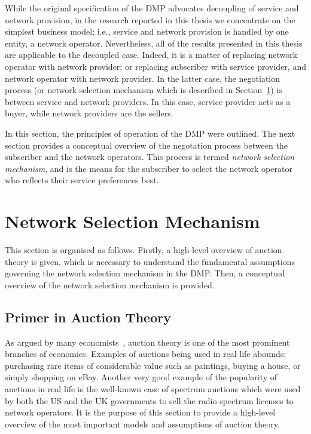 While the original specification of the DMP advocates decoupling of service and network provision, in the research reported in this thesis we concentrate on the simplest business model; i.e., service and network provision is handled by one entity, a network operator. Nevertheless, all of the results presented in this thesis are applicable to the decoupled case. Indeed, it is a matter of replacing network operator with network provider; or replacing subscriber with service provider, and network operator with network provider. In the latter case, the negotiation process (or network selection mechanism which is described in Section~\ref{sec:network_selection_mechanism_dmp}) is between service and network providers. In this case, service provider acts as a buyer, while network providers are the sellers.

In this section, the principles of operation of the DMP were outlined. The next section provides a conceptual overview of the negotation process between the subscriber and the network operators. This process is termed \emph{network selection mechanism}, and is the means for the subscriber to select the network operator who reflects their service preferences best.

\section{Network Selection Mechanism} %
\label{sec:network_selection_mechanism_dmp}
This section is organised as follows. Firstly, a high-level overview of auction theory is given, which is necessary to understand the fundamental assumptions governing the network selection mechanism in the DMP. Then, a conceptual overview of the network selection mechanism is provided.

\subsection{Primer in Auction Theory} %
\label{sub:primer_in_auction_theory_dmp}
As argued by many economists~\cite{Klemperer1999,Milgrom2004,Krishna10}, auction theory is one of the most prominent branches of economics. Examples of auctions being used in real life abounds: purchasing rare items of considerable value such as paintings, buying a house, or simply shopping on eBay. Another very good example of the popularity of auctions in real life is the well-known case of spectrum auctions which were used by both the US and the UK governments to sell the radio spectrum licenses to network operators. It is the purpose of this section to provide a high-level overview of the most important models and assumptions of auction theory.

